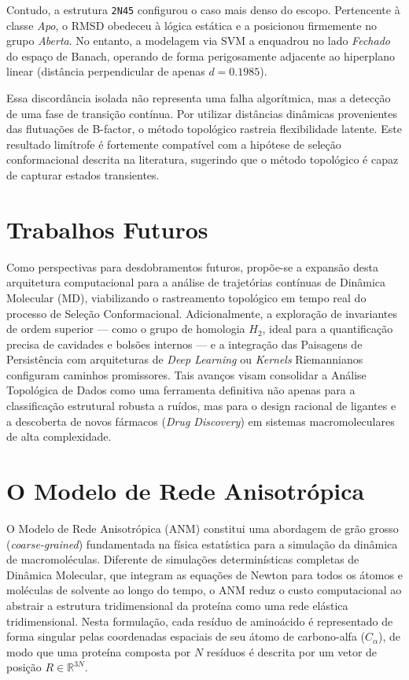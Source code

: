 \documentclass[12pt, a4paper]{article}
\theoremstyle{plain}
\theoremstyle{definition}
\theoremstyle{remark}
\newcommand{\ident}{\hspace{2em}}
\begin{document}
\ident Contudo, a estrutura \texttt{2N45} configurou o caso mais denso do escopo. Pertencente à classe \textit{Apo}, o RMSD obedeceu à lógica estática e a posicionou firmemente no grupo \textit{Aberta}. No entanto, a modelagem via SVM a enquadrou no lado \textit{Fechado} do espaço de Banach, operando de forma perigosamente adjacente ao hiperplano linear (distância perpendicular de apenas $d=0.1985$). 

\ident Essa discordância isolada não representa uma falha algorítmica, mas a detecção de uma fase de transição contínua. Por utilizar distâncias dinâmicas provenientes das flutuações de B-factor, o método topológico rastreia flexibilidade latente. Este resultado limítrofe é fortemente compatível com a hipótese de seleção conformacional descrita na literatura, sugerindo que o método topológico é capaz de capturar estados transientes.

\section{Trabalhos Futuros}
\ident Como perspectivas para desdobramentos futuros, propõe-se a expansão desta arquitetura computacional para a análise de trajetórias contínuas de Dinâmica Molecular (MD), viabilizando o rastreamento topológico em tempo real do processo de Seleção Conformacional. Adicionalmente, a exploração de invariantes de ordem superior — como o grupo de homologia $H_2$, ideal para a quantificação precisa de cavidades e bolsões internos — e a integração das Paisagens de Persistência com arquiteturas de \textit{Deep Learning} ou \textit{Kernels} Riemannianos configuram caminhos promissores. Tais avanços visam consolidar a Análise Topológica de Dados como uma ferramenta definitiva não apenas para a classificação estrutural robusta a ruídos, mas para o design racional de ligantes e a descoberta de novos fármacos (\textit{Drug Discovery}) em sistemas macromoleculares de alta complexidade.

\newpage

\appendix

\section{O Modelo de Rede Anisotrópica}
\label{apx:anm}

\ident O Modelo de Rede Anisotrópica (ANM) constitui uma abordagem de grão grosso (\textit{coarse-grained}) fundamentada na física estatística para a simulação da dinâmica de macromoléculas. Diferente de simulações determinísticas completas de Dinâmica Molecular, que integram as equações de Newton para todos os átomos e moléculas de solvente ao longo do tempo, o ANM reduz o custo computacional ao abstrair a estrutura tridimensional da proteína como uma rede elástica tridimensional. Nesta formulação, cada resíduo de aminoácido é representado de forma singular pelas coordenadas espaciais de seu átomo de carbono-alfa ($C_\alpha$), de modo que uma proteína composta por $N$ resíduos é descrita por um vetor de posição $R \in \mathbb{R}^{3N}$.
\end{document}
